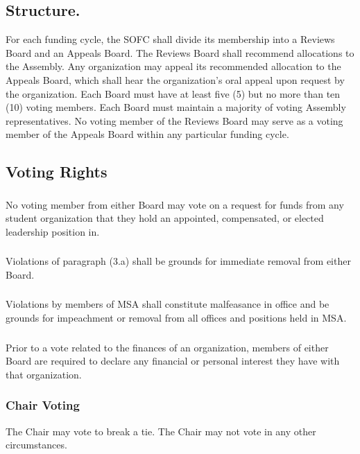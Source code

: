 \subsection{Structure.}
For each funding cycle, the SOFC shall divide its membership into a Reviews Board and an Appeals Board.  The Reviews Board shall recommend allocations to the Assembly.  Any organization may appeal its recommended allocation to the Appeals Board, which shall hear the organization's oral appeal upon request by the organization.  Each Board must have at least five (5) but no more than ten (10) voting members.  Each Board must maintain a majority of voting Assembly representatives.  No voting member of the Reviews Board may serve as a voting member of the Appeals Board within any particular funding cycle.

\subsection{Voting Rights}
\subsubsection{}
No voting member from either Board may vote on a request for funds from any student organization that they hold an appointed, compensated, or elected leadership position in.
\subsubsection{}
Violations of paragraph (3.a) shall be grounds for immediate removal from either Board.
\subsubsection{}
Violations by members of MSA shall constitute malfeasance in office and be grounds for impeachment or removal from all offices and positions held in MSA.
\subsubsection{}
Prior to a vote related to the finances of an organization, members of either Board are required to declare any financial or personal interest they have with that organization.
\subsubsection{Chair Voting}
\subsubsubsection{}
The Chair may vote to break a tie.
\subsubsubsection{}
The Chair may not vote in any other circumstances.

